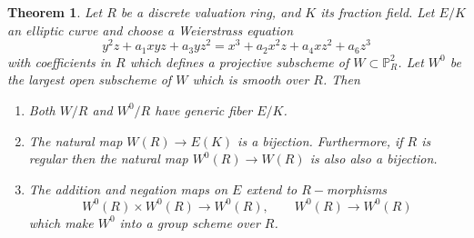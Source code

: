 \documentclass{article}
\newtheorem{theorem}{Theorem}[section]
\theoremstyle{definition}
\theoremstyle{remark}
\theoremstyle{plain}
\newcommand{\mb}[1]{\mathbb{#1}}
\begin{document}
\begin{theorem}\label{theo:4.1}
	Let $R$ be a discrete valuation ring, and $K$ its fraction field. 
	Let $E/K$ an elliptic curve and choose a Weierstrass equation 
	\[y^2z + a_1xyz + a_3yz^2 = x^3 + a_2x^2z + a_4xz^2 + a_6z^3\]
	with coefficients in $R$ which defines a projective subscheme of $W \subset \mb{P}^2_R$.
	Let $W^0$ be the largest open subscheme of $W$ which is smooth over $R$. 
	Then 
\begin{enumerate}
	\item Both $W/R$ and $W^0/R$ have generic fiber $E/K$.
	\item The natural map $W(R) \to E(K)$ is a bijection. 
		Furthermore, if $R$ is regular then the natural map $W^0(R) \to W(R)$ is also also a  bijection.
	\item The addition and negation maps on $E$ extend to $R-$morphisms
	\[W^0(R) \times W^0(R) \to W^0(R), \quad \quad W^0(R) \to W^0(R) \]
	which make $W^0$ into a group scheme over $R$.
\end{enumerate}

\end{theorem}
\end{document}
